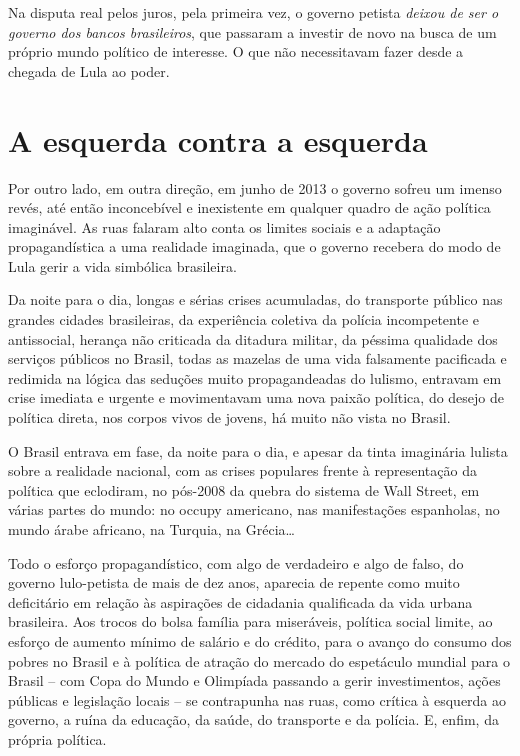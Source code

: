 Na disputa real pelos juros, pela primeira vez, o governo petista
\emph{deixou de ser o governo dos bancos brasileiros}, que passaram a
investir de novo na busca de um próprio mundo político de interesse. O
que não necessitavam fazer desde a chegada de Lula ao poder.

  \section{A esquerda contra a
  esquerda}\label{a-esquerda-contra-a-esquerda}

Por outro lado, em outra direção, em junho de 2013 o governo sofreu um
imenso revés, até então inconcebível e inexistente em qualquer quadro de
ação política imaginável. As ruas falaram alto conta os limites sociais
e a adaptação propagandística a uma realidade imaginada, que o governo
recebera do modo de Lula gerir a vida simbólica brasileira.

Da noite para o dia, longas e sérias crises acumuladas, do transporte
público nas grandes cidades brasileiras, da experiência coletiva da
polícia incompetente e antissocial, herança não criticada da ditadura
militar, da péssima qualidade dos serviços públicos no Brasil, todas as
mazelas de uma vida falsamente pacificada e redimida na lógica das
seduções muito propagandeadas do lulismo, entravam em crise imediata e
urgente e movimentavam uma nova paixão política, do desejo de política
direta, nos corpos vivos de jovens, há muito não vista no Brasil.

O Brasil entrava em fase, da noite para o dia, e apesar da tinta
imaginária lulista sobre a realidade nacional, com as crises populares
frente à representação da política que eclodiram, no pós-2008 da quebra
do sistema de Wall Street, em várias partes do mundo: no occupy
americano, nas manifestações espanholas, no mundo árabe africano, na
Turquia, na Grécia…

Todo o esforço propagandístico, com algo de verdadeiro e algo de falso,
do governo lulo-petista de mais de dez anos, aparecia de repente como
muito deficitário em relação às aspirações de cidadania qualificada da
vida urbana brasileira. Aos trocos do bolsa família para miseráveis,
política social limite, ao esforço de aumento mínimo de salário e do
crédito, para o avanço do consumo dos pobres no Brasil e à política de
atração do mercado do espetáculo mundial para o Brasil -- com Copa do
Mundo e Olimpíada passando a gerir investimentos, ações públicas e
legislação locais -- se contrapunha nas ruas, como crítica à esquerda ao
governo, a ruína da educação, da saúde, do transporte e da polícia. E,
enfim, da própria política.


